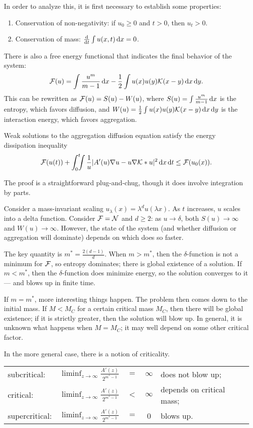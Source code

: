 In order to analyze this, it is first necessary to establish some properties:
\begin{enumerate}
\item Conservation of non-negativity: if $u_0 \ge 0$ and $t > 0$, then $u_t > 0$.
\item Conservation of mass: $\frac{\mathrm{d} }{\mathrm{d} t}\int u(x,t)\,\mathrm{d} x = 0$.
\end{enumerate}
There is also a free energy functional that indicates the final behavior of the system:
\[\mathcal F(u) = \int\frac{u^m}{m-1}\,\mathrm{d} x - \frac{1}{2}\int u(x)u(y)\mathcal K(x-y)\,\mathrm{d} x\,\mathrm{d} y.\]
This can be rewritten as $\mathcal F(u) = S(u) - W(u)$, where $S(u) = \int \frac{u^m}{m-1}\,\mathrm{d} x$ is the entropy, which favors diffusion, and $W(u) = \frac{1}{2}\int u(x)u(y)\mathcal K(x-y)\,\mathrm{d} x\,\mathrm{d} y$ is the interaction energy, which favors aggregation.
\begin{prop}
Weak solutions to the aggregation diffusion equation satisfy the energy dissipation inequality
\[\mathcal F(u(t)) +\int_0^t\!\!\!\int\frac{1}{u}|A'(u)\nabla u - u\nabla\mathcal K * u|^2\,\mathrm{d} x\,\mathrm{d} t \le \mathcal F(u_0(x)).\]
\end{prop}
The proof is a straightforward plug-and-chug, though it does involve integration by parts.

Consider a mass-invariant scaling $u_\lambda(x) = \lambda^d u(\lambda x)$. As $t$ increases, $u$ scales into a delta function. Consider $\mathcal F = \mathcal N$ and $d\ge 2$: as $u\to\delta$, both $S(u)\to\infty$ and $W(u)\to \infty$. However, the state of the system (and whether diffusion or aggregation will dominate) depends on which does so faster.

The key quantity is $m^* = \frac{2(d-1)}{d}$. When $m > m^*$, then the $\delta$-function is not a minimum for $\mathcal F$, so entropy dominates; there is global existence of a solution. If $m < m^*$, then the $\delta$-function does minimize energy, so the solution converges to it ---  and blows up in finite time.

If $m = m^*$, more interesting things happen. The problem then comes down to the initial mass. If $M < M_C$ for a certain critical mass $M_C$, then there will be global existence; if it is strictly greater, then the solution will blow up. In general, it is unknown what happens when $M = M_C$; it may well depend on some other critical factor.

In the more general case, there is a notion of criticality.
\begin{center}
\begin{tabular}{l r c c l}
subcritical: & $\displaystyle{\liminf_{z\to\infty} \frac{A'(z)}{2^{m^*-1}}}$ &$=$ &$\infty$ & does not blow up;\\
critical: &$\displaystyle{\liminf_{z\to\infty} \frac{A'(z)}{2^{m^*-1}}}$ &$<$ &$\infty$ & depends on critical mass;\\
supercritical: &$\displaystyle{\liminf_{z\to\infty} \frac{A'(z)}{2^{m^*-1}}}$ &$=$ &0 & blows up.
\end{tabular}
\end{center}
